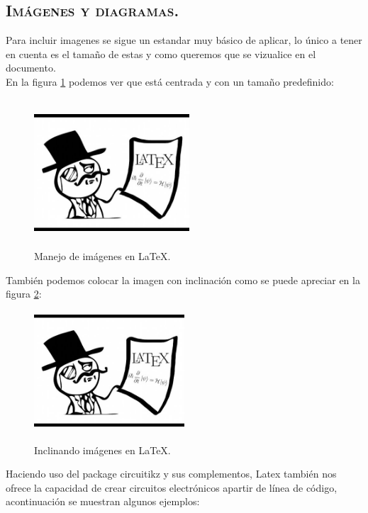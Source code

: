 \documentclass[journal, spanish]{IEEEtran}
\begin{document}
\subsection{\textsc{Imágenes y diagramas.}}
Para incluir imagenes se sigue un estandar muy básico de aplicar, lo único a tener en cuenta es el tamaño de estas y como queremos que se vizualice en el documento.\\

\noindent En la figura \ref{fig:led_Frit} podemos ver que está centrada y con un tamaño predefinido:
\begin{figure}[H]%
    \begin {center}
        \includegraphics[width=5.8cm, height=5.5cm]{Images/Latex.jpeg}
        \caption{Manejo de imágenes en LaTeX.}
        \label{fig:led_Frit}
    \end {center}
\end{figure}

\noindent También podemos colocar la imagen con inclinación como se puede apreciar en la figura \ref{fig:images}:
\begin{figure}[H]%
    \centering
    \caption{Inclinando imágenes en LaTeX.}
    \includegraphics[width=5.6cm, height=4.45cm, angle=180]{Images/Latex.jpeg}
    \label{fig:images}
\end{figure}

\noindent Haciendo uso del package circuitikz y sus complementos, Latex también nos ofrece la capacidad de crear circuitos electrónicos apartir de línea de código, acontinuación se muestran algunos ejemplos:\\
\end{document}
